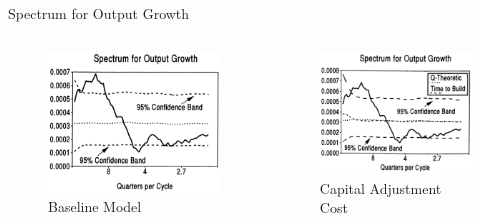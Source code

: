 \documentclass[10pt]{beamer}
\begin{document}
\begin{frame}{Spectrum for Output Growth}
    \begin{columns}[T,onlytextwidth]
        \begin{figure}
            \centering
            \includegraphics[width=\linewidth]{figures/Base_spect.png}
            \caption{Baseline Model}
        \end{figure}

        \begin{figure}
            \centering
            \includegraphics[width=\linewidth]{figures/K_spect.png}
            \caption{Capital Adjustment Cost}
        \end{figure}


\end{columns}
\end{frame}
\end{document}
